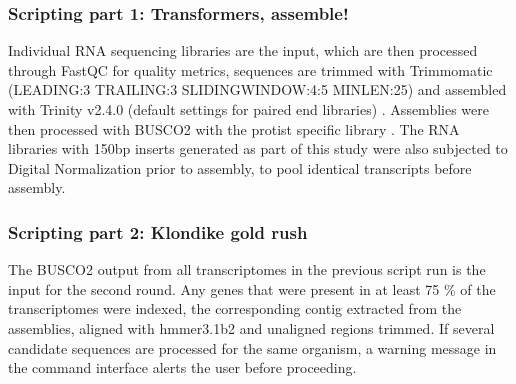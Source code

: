 \documentclass[12pt]{article}
\begin{document}
\subsubsection*{Scripting part 1: Transformers, assemble!}
Individual RNA sequencing libraries are the input, which are then processed through FastQC \cite{fastqc} for quality metrics, sequences are trimmed with Trimmomatic (LEADING:3 TRAILING:3 SLIDINGWINDOW:4:5 MINLEN:25) \cite{bolger2014trimmomatic} and assembled with Trinity v2.4.0 (default settings for paired end libraries) \cite{haas2013novo}. 
Assemblies were then processed with BUSCO2 with the protist specific library \cite{simao2015busco}.
The RNA libraries with 150bp inserts generated as part of this study were also subjected to Digital Normalization \cite{diginorm} prior to assembly, to pool identical transcripts before assembly.                                                                                                                                                                                                                                                                                                                                                                                                                                                                                                                                                                                                                                                                                                                                                                                                                                                                                                                                                                                                                                                                                                                                                                                                                                                                                                                                           
\subsubsection*{Scripting part 2: Klondike gold rush}
The BUSCO2 output from all transcriptomes in the previous script run is the input for the second round. 
Any genes that were present in at least 75 \% of the transcriptomes were indexed, the corresponding contig extracted from the assemblies, aligned with hmmer3.1b2 \cite{eddy2015hmmer} and unaligned regions trimmed.
If several candidate sequences are processed for the same organism, a warning message in the command interface alerts the user before proceeding.
\end{document}
